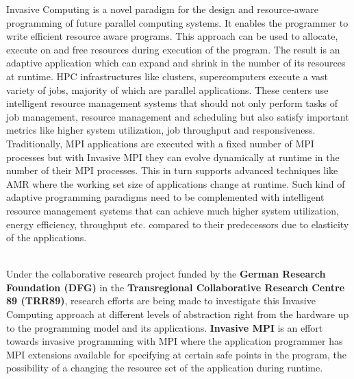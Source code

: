 Invasive Computing is a novel paradigm for the design and resource-aware programming of future parallel computing systems. It enables the programmer to write efficient resource aware programs. This approach can be used to allocate, execute on and free resources during execution of the program. The result is an adaptive application which can expand and shrink in the number of its resources at runtime. HPC infrastructures like clusters, supercomputers execute a vast variety of jobs, majority of which are parallel applications. These centers use intelligent resource management systems that should not only perform tasks of job management, resource management and scheduling but also satisfy important metrics like higher system utilization, job throughput and responsiveness. Traditionally, MPI applications are executed with a fixed number of MPI processes but with Invasive MPI they can evolve dynamically at runtime in the number of their MPI processes. This in turn supports advanced techniques like AMR where the working set size of applications change at runtime. Such kind of adaptive programming paradigms need to be complemented with intelligent resource management systems that can  achieve much higher system utilization, energy efficiency, throughput etc. compared to their predecessors due to elasticity of the applications.\par
\noindent
\\Under the collaborative research project funded by the \textbf{German Research Foundation (DFG)} in the \textbf{Transregional Collaborative Research Centre 89 (TRR89)}, research efforts are being made to investigate this Invasive Computing approach at different levels of abstraction right from the hardware up to the programming model and its applications. \textbf{Invasive MPI} is an effort towards invasive programming with MPI where the application programmer has MPI extensions available for specifying at certain safe points in the program, the possibility of a changing the resource set of the application during runtime.\\ \par

